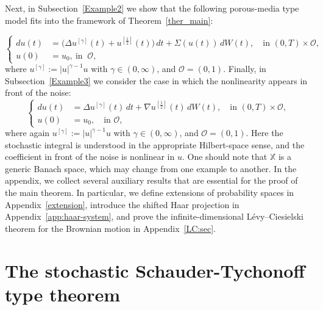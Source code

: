 \documentclass[english,a4paper,11pt]{amsart}
\theoremstyle{plain}
\theoremstyle{definition}
\theoremstyle{remark}
\numberwithin{equation}{section}
\newcommand{\Ocal} {{\mathcal O}}
\begin{document}
%
Next, in Subsection~\ref{Example2} we show that the following porous-media type model fits into the framework of Theorem~\ref{ther_main}:
%


\begin{equation*}
	\left\{
	\begin{aligned}
		du(t)&= \big(\Delta u^{[\gamma]}(t)+u^{[\frac{1}{2}]}(t)\big)\,d t+ \Sigma(u(t))\,dW(t),\quad \text{in } (0,T)\times \Ocal,\\
		u(0)&=u_0,\ \text{in }\ \Ocal, 
	\end{aligned}
	\right.
\end{equation*}
where \(u^{[\gamma]}:=|u|^{\gamma-1}u\) with \(\gamma\in(0,\infty)\), and \(\Ocal=(0,1)\).
%
Finally,  in Subsection~\ref{Example3} 
 we consider the case in which the nonlinearity appears in front of the noise:
\begin{equation*} 
	\left\{
	\begin{aligned}
		du(t)&= \Delta u^{[\gamma]}(t)\,d t+ \nabla u^{[\frac{1}{2}]}(t)\,dW(t),\quad \text{in } (0,T)\times \Ocal,\\
		u(0)&=u_0,\quad \text{in } \Ocal, 
	\end{aligned}
	\right.
\end{equation*}
where again \(u^{[\gamma]}:=|u|^{\gamma-1}u\) with \(\gamma\in(0,\infty)\), and \(\Ocal=(0,1)\).
Here the stochastic integral is understood in the appropriate Hilbert-space sense, and the coefficient in front of the noise is nonlinear in \(u\). {One should note that $\mathbb{X}$ is a generic Banach space, which may change from one example to another.}
In the appendix, we collect several auxiliary results that are essential for the proof of the main theorem. In particular, we define extensions of probability spaces in Appendix~\ref{extension}, introduce the shifted Haar projection in Appendix~\ref{app:haar-system}, and prove the infinite-dimensional L\'evy–Ciesielski theorem for the Brownian motion in Appendix~\ref{LC:sec}.


	
	\section{The stochastic Schauder-Tychonoff type theorem}\label{schauder}
	
\end{document}
